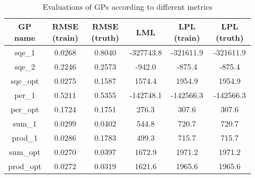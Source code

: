\begin{table}
    \centering
    \begin{tabular}{|c|c|c|c|c|c|}
        \hline
        GP name & RMSE (train) & RMSE (truth) & LML & LPL (train) & LPL (truth) \\
        \hline
        sqe\_1 & 0.0268 & 0.8040 & -327743.8 & -321611.9 & -321611.9 \\
        sqe\_2 & 0.2246 & 0.2573 & -942.0 & -875.4 & -875.4 \\
        sqe\_opt & 0.0275 & 0.1587 & 1574.4 & 1954.9 & 1954.9 \\
        per\_1 & 0.5211 & 0.5355 & -142748.1 & -142566.3 & -142566.3 \\
        per\_opt & 0.1724 & 0.1751 & 276.3 & 307.6 & 307.6 \\
        sum\_1 & 0.0299 & 0.0402 & 544.8 & 720.7 & 720.7 \\
        prod\_1 & 0.0286 & 0.1783 & 499.3 & 715.7 & 715.7 \\
        sum\_opt & 0.0270 & 0.0397 & 1672.9 & 1971.2 & 1971.2 \\
        prod\_opt & 0.0272 & 0.0319 & 1621.6 & 1965.6 & 1965.6 \\
        \hline
    \end{tabular}
    \caption{Evaluations of GPs according to different metrics}
    \label{table:metrics}
\end{table}
